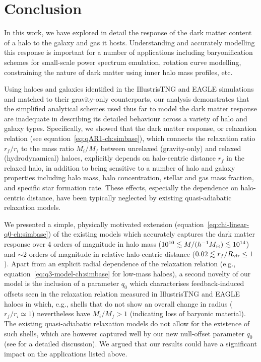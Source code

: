 \section{Conclusion}
\label{sec:conclusion-ch:simbase}
In this work, we have explored in detail the response of the dark matter content of a halo to the galaxy and gas it hosts. Understanding and accurately modelling this response is important for a number of applications including baryonification schemes for small-scale power spectrum emulation, rotation curve modelling, %
constraining the nature of dark matter using inner halo mass profiles, etc. 

Using haloes and galaxies identified in the IllustrisTNG and EAGLE simulations and matched to their gravity-only counterparts, our analysis demonstrates that the simplified analytical schemes used thus far to model the dark matter response \citep[e.g.,][]{1986ApJ...301...27B,2010MNRAS.407..435A,2015JCAP...12..049S} are inadequate in describing its detailed behaviour across a variety of halo and galaxy types. Specifically, we showed that the dark matter response, or relaxation relation (see equation~\ref{eq:qAR1-ch:simbase}), which connects the relaxation ratio $r_f/r_i$ to the mass ratio $M_i/M_f$ between unrelaxed (gravity-only) and relaxed (hydrodynamical) haloes, explicitly depends on halo-centric distance $r_f$ in the relaxed halo, in addition to being sensitive to a number of halo and galaxy properties including halo mass, halo concentration, stellar and gas mass fraction, and specific star formation rate. These effects, especially the dependence on halo-centric distance, have been typically neglected by existing quasi-adiabatic relaxation models. 

We presented a simple, physically motivated extension (equation~\ref{eq:chi-linear-q0-ch:simbase}) of the existing models which accurately captures the dark matter response over 4 orders of magnitude in halo mass ($10^{10}\lesssim M/(h^{-1}M_{\odot})\lesssim 10^{14}$) and $\sim2$ orders of magnitude in relative halo-centric distance ($0.02\lesssim r_f/R_{\rm vir}\leq1$). Apart from an explicit radial dependence of the relaxation relation (e.g., equation~\ref{eq:q3-model-ch:simbase} for low-mass haloes), a second novelty of our model is the inclusion of a parameter $q_0$ which characterises feedback-induced offsets seen in the relaxation relation measured in IllustrisTNG and EAGLE haloes in which, e.g., shells that do not show an overall change in radius ($r_f/r_i\simeq1$) nevertheless have $M_i/M_f>1$ (indicating loss of baryonic material). The existing quasi-adiabatic relaxation models do not allow for the existence of such shells, which are however captured well by our new null-offset parameter $q_0$ (see  for a detailed discussion).
We argued that our results could have a significant impact on the applications listed above.


